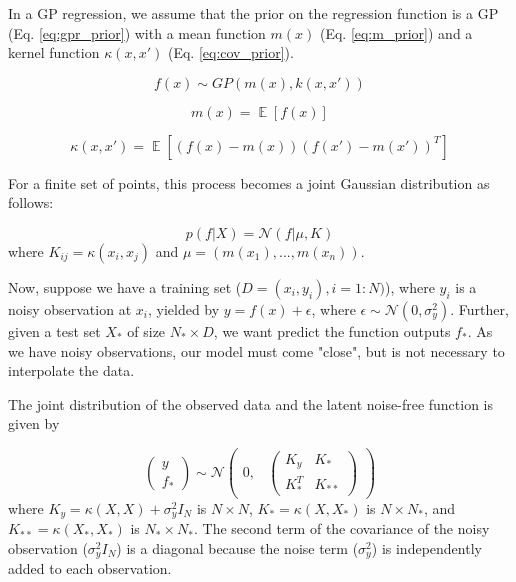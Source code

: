 \documentclass{article}
\DeclareMathOperator{\E}{\mathbb{E}}
\begin{document}
In a GP regression, we assume that the prior on the regression function is a GP (Eq. \eqref{eq:gpr_prior}) with a mean function $m(x)$ (Eq. \eqref{eq:m_prior}) and a kernel function $\kappa(x,x')$ (Eq. \eqref{eq:cov_prior}). 

\begin{equation}
  f(x) \sim GP(m(x), k(x,x'))
  \label{eq:gpr_prior}
\end{equation}

\begin{equation}
  m(x) = \E[f(x)]
  \label{eq:m_prior}
\end{equation}

\begin{equation}
  \kappa(x,x') = \E[(f(x) - m(x))(f(x') - m(x'))^T]
  \label{eq:cov_prior}
\end{equation}

For a finite set of points, this process becomes a joint Gaussian distribution as follows: 

\begin{equation}
  p(f|X) = \mathcal{N}(f|\mu, K)
  \label{eq:jointGaussian}
\end{equation}
where $K_{ij} = \kappa(x_i, x_j)$ and $\mu = (m(x_1), ..., m(x_n))$.

Now, suppose we have a training set ($D = {(x_i, y_i), i = 1:N)}$), where $y_i$ is a noisy observation at $x_i$, yielded by $y = f(x) + \epsilon$, where $\epsilon \sim \mathcal{N}(0, \sigma_y^2)$. Further, given a test set $X_*$ of size $N_* \times D$, we want predict the function outputs $f_*$. As we have noisy observations, our model must come "close", but is not necessary to interpolate the data.

The joint distribution of the observed data and the latent noise-free function is given by

\begin{equation}
  \begin{pmatrix}
      y \\ 
      f_*
  \end{pmatrix}
  \sim \mathcal{N}
  \begin{pmatrix}
  0, & \begin{pmatrix} K_y & K_* \\ K_*^T & K_{**} \end{pmatrix}
  \end{pmatrix}
\end{equation}
where $K_y = \kappa(X, X) + \sigma_y^2I_N$ is $N \times N$,
$K_* = \kappa(X, X_*)$ is $N \times N_*$, and $K_{**} = \kappa(X_*, X_*)$ is $N_* \times N_*$. The second term of the covariance of the noisy observation ($\sigma_y^2I_N$) is a diagonal because the noise term ($\sigma_y^2$) is independently added to each observation. 
\end{document}
